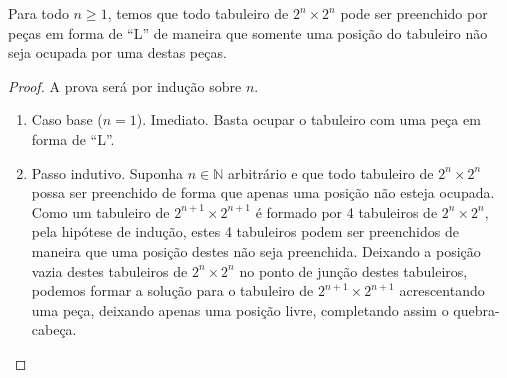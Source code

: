 \begin{Theorem}
Para todo $n \geq 1$, temos que todo tabuleiro de $2^n \times 2^n$
pode ser preenchido por peças em forma de ``L'' de maneira que somente
uma posição do tabuleiro não seja ocupada por uma destas peças.
\end{Theorem}
\begin{proof}
A prova será por indução sobre $n$.
\begin{enumerate}
  \item Caso base ($n = 1$). Imediato. Basta ocupar o tabuleiro com
    uma peça em forma de ``L''.
  \item Passo indutivo. Suponha $n \in \mathbb{N}$ arbitrário e que
    todo tabuleiro de $2^n \times 2^n$ possa ser preenchido de forma que
    apenas uma posição não esteja ocupada. Como um tabuleiro de $2^{n
      + 1} \times 2^{n + 1}$ é formado por 4 tabuleiros de $2^n\times
    2^n$, pela hipótese de indução, estes 4 tabuleiros podem ser
    preenchidos de maneira que uma posição destes não seja
    preenchida. Deixando a posição vazia destes tabuleiros de
    $2^n\times 2^n$ no ponto de junção destes tabuleiros, podemos
    formar a solução para o tabuleiro de $2^{n+1}\times 2^{n+1}$
    acrescentando uma peça, deixando apenas uma posição livre,
    completando assim o quebra-cabeça.
\end{enumerate}
\end{proof}

